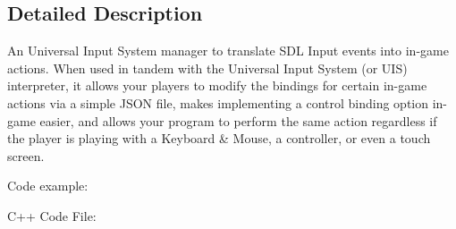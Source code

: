 \subsection{Detailed Description}
An Universal Input System manager to translate S\+DL Input events into in-\/game actions. When used in tandem with the Universal Input System (or U\+IS) interpreter, it allows your players to modify the bindings for certain in-\/game actions via a simple J\+S\+ON file, makes implementing a control binding option in-\/game easier, and allows your program to perform the same action regardless if the player is playing with a Keyboard \& Mouse, a controller, or even a touch screen.

Code example\+: \begin{DoxyVerb}C++ Code File:
\end{DoxyVerb}
 
